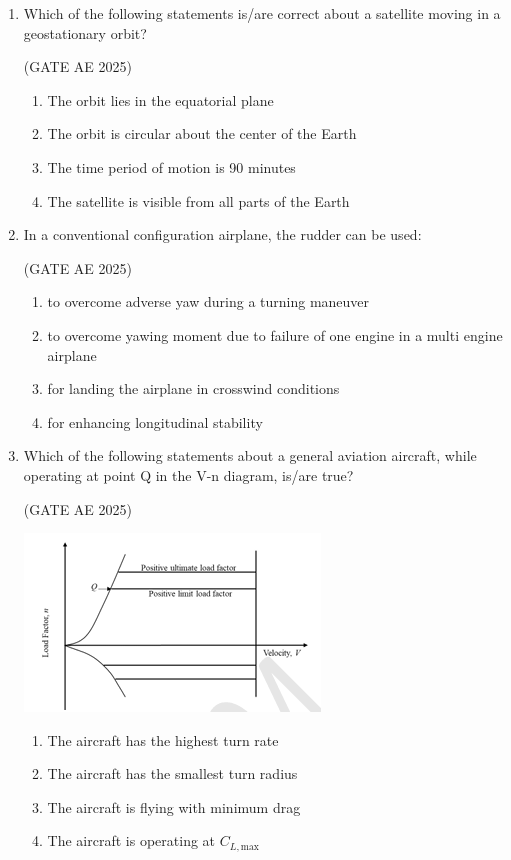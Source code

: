 \documentclass[journal,12pt,onecolumn]{IEEEtran}
\theoremstyle{remark}
\begin{document}
\begin{flushleft}
\begin{enumerate}
\begin{enumerate}
\end{enumerate}
    
\item  Which of the following statements is/are correct about a satellite moving in a geostationary orbit? 

\hfill (GATE AE 2025)

\begin{enumerate}
    \item The orbit lies in the equatorial plane
    \item The orbit is circular about the center of the Earth
    \item The time period of motion is 90 minutes
    \item The satellite is visible from all parts of the Earth
\end{enumerate}

\item  In a conventional configuration airplane, the rudder can be used:

\hfill (GATE AE 2025)

\begin{enumerate}
    \item to overcome adverse yaw during a turning maneuver
    \item to overcome yawing moment due to failure of one engine in a multi engine airplane
    \item for landing the airplane in crosswind conditions
    \item for enhancing longitudinal stability
\end{enumerate}

\item  Which of the following statements about a general aviation aircraft, while operating at point Q in the V-n diagram, is/are true?

\hfill (GATE AE 2025)

\begin{center}
\includegraphics[width=0.5\columnwidth]{figs/pic.png}
\end{center}

\begin{enumerate}
    \item The aircraft has the highest turn rate
    \item The aircraft has the smallest turn radius
    \item The aircraft is flying with minimum drag
    \item The aircraft is operating at $C_{L,\text{max}}$
\end{enumerate}


\end{enumerate}
\end{flushleft}
\end{document}

